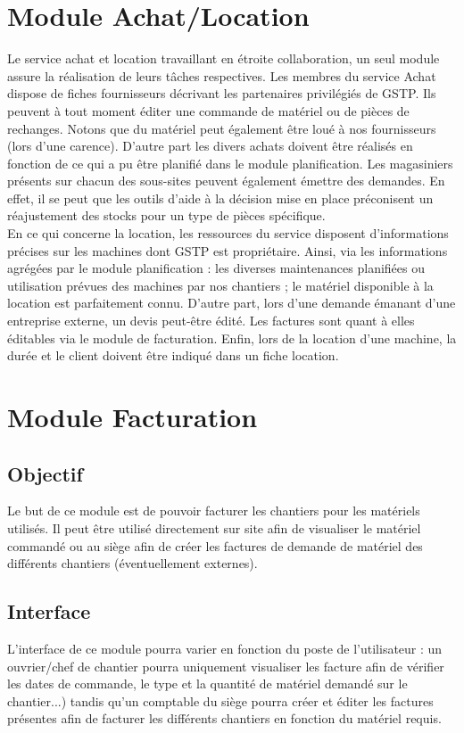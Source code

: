 \section{Module Achat/Location}
Le service achat et location travaillant en étroite collaboration, un seul module assure la réalisation de leurs tâches respectives. 
Les membres du service Achat dispose de fiches fournisseurs décrivant les partenaires privilégiés de GSTP. 
Ils peuvent à tout moment éditer une commande de matériel ou de pièces de rechanges. 
Notons que du matériel peut également être loué à nos fournisseurs (lors d’une carence). 
D’autre part les divers achats doivent être réalisés en fonction de ce qui a pu être planifié dans le module planification. 
Les magasiniers présents sur chacun des sous-sites peuvent également émettre des demandes. 
En effet, il se peut que les outils d’aide à la décision mise en place préconisent un réajustement des stocks pour un type de pièces spécifique.\\
En ce qui concerne la location, les ressources du service disposent d’informations précises sur les machines dont GSTP est propriétaire. 
Ainsi, via les informations agrégées par le module planification : les diverses maintenances planifiées ou utilisation prévues des machines par nos chantiers ; le matériel disponible à la location est parfaitement connu. 
D’autre part, lors d’une demande émanant d’une entreprise externe, un devis peut-être édité. 
Les factures sont quant à elles éditables via le module de facturation. 
Enfin, lors de la location d’une machine, la durée et le client doivent être indiqué dans un fiche location.

\section {Module Facturation}

	\subsection {Objectif}
	Le but de ce module est de pouvoir facturer les chantiers pour les matériels utilisés. 
	Il peut être utilisé directement sur site afin de visualiser le matériel commandé ou au siège afin de créer les factures de demande de matériel des différents chantiers (éventuellement externes).

	\subsection {Interface}
	L'interface de ce module pourra varier en fonction du poste de l'utilisateur : 
	un ouvrier/chef de chantier pourra uniquement visualiser les facture afin de vérifier les dates de commande, 
	le type et la quantité de matériel demandé sur le chantier...) tandis qu'un comptable du siège pourra créer et éditer les factures présentes afin de facturer les différents chantiers en fonction du matériel requis.

